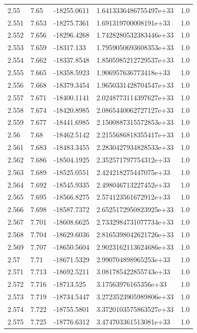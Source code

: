 \begin{tabular}{lllll}
2.55 & 7.65 & -18255.0611 & 1.6413336486755497e+33 & 1.0 \\
2.551 & 7.653 & -18275.7361 & 1.691319700008191e+33 & 1.0 \\
2.552 & 7.656 & -18296.4268 & 1.7428280532383446e+33 & 1.0 \\
2.553 & 7.659 & -18317.133 & 1.7959050693608353e+33 & 1.0 \\
2.554 & 7.662 & -18337.8548 & 1.8505985212729537e+33 & 1.0 \\
2.555 & 7.665 & -18358.5923 & 1.906957636773418e+33 & 1.0 \\
2.556 & 7.668 & -18379.3454 & 1.9650331428704547e+33 & 1.0 \\
2.557 & 7.671 & -18400.1141 & 2.0248773114397627e+33 & 1.0 \\
2.558 & 7.674 & -18420.8985 & 2.0865440062727127e+33 & 1.0 \\
2.559 & 7.677 & -18441.6985 & 2.1500887315572853e+33 & 1.0 \\
2.56 & 7.68 & -18462.5142 & 2.2155686818355417e+33 & 1.0 \\
2.561 & 7.683 & -18483.3455 & 2.2830427934828533e+33 & 1.0 \\
2.562 & 7.686 & -18504.1925 & 2.352571797754312e+33 & 1.0 \\
2.563 & 7.689 & -18525.0551 & 2.424218275447075e+33 & 1.0 \\
2.564 & 7.692 & -18545.9335 & 2.498046713227452e+33 & 1.0 \\
2.565 & 7.695 & -18566.8275 & 2.574123561672912e+33 & 1.0 \\
2.566 & 7.698 & -18587.7372 & 2.6525172950823925e+33 & 1.0 \\
2.567 & 7.701 & -18608.6625 & 2.7332984731077734e+33 & 1.0 \\
2.568 & 7.704 & -18629.6036 & 2.8165398042621726e+33 & 1.0 \\
2.569 & 7.707 & -18650.5604 & 2.9023162113624686e+33 & 1.0 \\
2.57 & 7.71 & -18671.5329 & 2.990704898965253e+33 & 1.0 \\
2.571 & 7.713 & -18692.5211 & 3.081785422855743e+33 & 1.0 \\
2.572 & 7.716 & -18713.525 & 3.17563976165356e+33 & 1.0 \\
2.573 & 7.719 & -18734.5447 & 3.2723523905989806e+33 & 1.0 \\
2.574 & 7.722 & -18755.5801 & 3.3720103575863527e+33 & 1.0 \\
2.575 & 7.725 & -18776.6312 & 3.474703361513081e+33 & 1.0 \\

\end{tabular}
